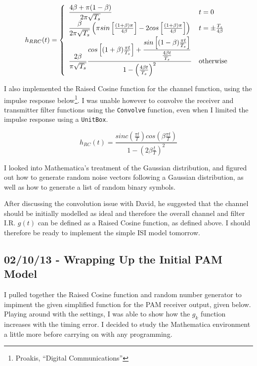 \[
h_{RRC}(t) = \left\{
  \begin{array}{l l}
    \dfrac{4 \beta + \pi (1 - \beta)}{2 \pi \sqrt{T_s}} & t = 0 \\
    \dfrac{\beta}{2 \pi \sqrt{T_s}} \left ( \pi sin \left [ \frac{(1 + \beta) \pi}{4 \beta} \right ] - 2 cos \left [ \frac{(1 + \beta) \pi}{4 \beta} \right ] \right ) & t = \pm \frac{T_s}{ 4 \beta } \\
    \dfrac{2 \beta}{\pi \sqrt{T_s}} \dfrac{cos \left [ (1 + \beta) \frac{\pi t}{T_s} \right ] + \dfrac{sin \left [ (1 - \beta) \frac{\pi t}{T_s} \right ]}{\frac{4 \beta t}{T_s}}}{1 - \left ( \frac{4 \beta t}{T_s} \right )^2} & \text{otherwise}
  \end{array}\right.
\]

I also implemented the Raised Cosine function for the channel function,
using the impulse response below\footnote{Proakis, ``Digital
  Communications''}. I was unable however to convolve the receiver and
transmitter filter functions using the \texttt{Convolve} function, even
when I limited the impulse response using a \texttt{UnitBox}.

\[
h_{RC}(t) = \frac{sinc \left ( \frac{\pi t}{T} \right ) cos \left ( \beta \frac{\pi t}{T} \right )}{1 - \left ( 2 \beta \frac{t}{T} \right )^2}
\]

I looked into Mathematica's treatment of the Gaussian distribution, and
figured out how to generate random noise vectors following a Gaussian
distribution, as well as how to generate a list of random binary
symbols.

After discussing the convolution issue with David, he suggested that the
channel should be initially modelled as ideal and therefore the overall
channel and filter I.R. $g(t)$ can be defined as a Raised Cosine
function, as defined above. I should therefore be ready to implement the
simple ISI model tomorrow.

\subsection{02/10/13 - Wrapping Up the Initial PAM Model}

I pulled together the Raised Cosine function and random number generator
to impiment the given simplified function for the PAM receiver output,
given below. Playing around with the settings, I was able to show how
the $g_k$ function increases with the timing error. I decided to study
the Mathematica environment a little more before carrying on with any
programming.

